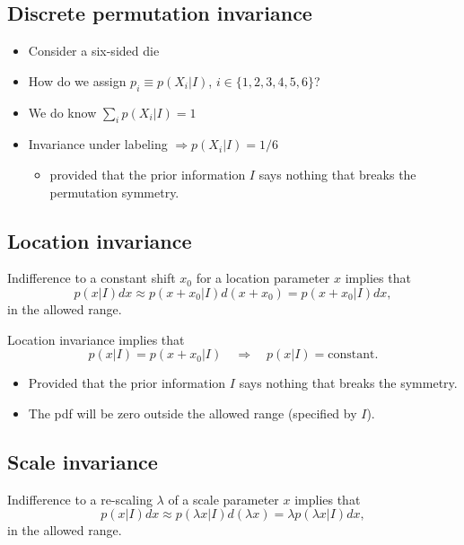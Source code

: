\documentclass[%
oneside,                 %
final,                   %
10pt]{article}
\begin{document}
\subsection{Discrete permutation invariance}
\begin{itemize}
\item Consider a six-sided die

\item How do we assign $p_i \equiv p(X_i|I)$, $i \in \{1, 2, 3, 4, 5, 6\}$?

\item We do know $\sum_i p(X_i|I) = 1$

\item Invariance under labeling $\Rightarrow p(X_i|I)=1/6$
\begin{itemize}

  \item provided that the prior information $I$ says nothing that breaks the permutation symmetry.
\end{itemize}

\noindent
\end{itemize}

\noindent
\subsection{Location invariance}
Indifference to a constant shift $x_0$ for a location parameter $x$ implies that
\[
p(x|I) dx \approx p(x+ x_0|I) d(x+x_0) =  p(x+ x_0|I) dx,
\]
in the allowed range.

Location invariance implies that
\[
p(x|I) =  p(x+ x_0|I) \quad \Rightarrow \quad p(x|I) = \mathrm{constant}.
\]

\begin{itemize}
\item Provided that the prior information $I$ says nothing that breaks the symmetry.

\item The pdf will be zero outside the allowed range (specified by $I$).
\end{itemize}

\noindent
\subsection{Scale invariance}

Indifference to a re-scaling $\lambda$ of a scale parameter $x$ implies that
\[
p(x|I) dx \approx p(\lambda x|I) d(\lambda x) =  \lambda p(\lambda x|I) dx,
\]
in the allowed range.
\end{document}
